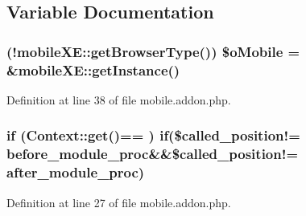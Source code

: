 \subsection{Variable Documentation}
\subsubsection[{\texorpdfstring{\$o\+Mobile}{$oMobile}}]{ (!{\bf mobile\+X\+E\+::get\+Browser\+Type}()) \$o\+Mobile = \&{\bf mobile\+X\+E\+::get\+Instance}()}\hypertarget{mobile_8addon_8php_a2e1472c6f1bb5b341e95a632164904d0}{}\label{mobile_8addon_8php_a2e1472c6f1bb5b341e95a632164904d0}


Definition at line 38 of file mobile.\+addon.\+php.

\subsubsection[{\texorpdfstring{if}{if}}]{\setlength{\rightskip}{0pt plus 5cm}if ({\bf Context\+::get}(\textquotesingle{})== \textquotesingle{}) if(\$called\+\_\+position!= \textquotesingle{}before\+\_\+module\+\_\+proc\textquotesingle{}\&\&\$called\+\_\+position!= \textquotesingle{}after\+\_\+module\+\_\+proc\textquotesingle{})}\hypertarget{mobile_8addon_8php_a13d720e0d3597438cb76873850ce4b63}{}\label{mobile_8addon_8php_a13d720e0d3597438cb76873850ce4b63}


Definition at line 27 of file mobile.\+addon.\+php.


